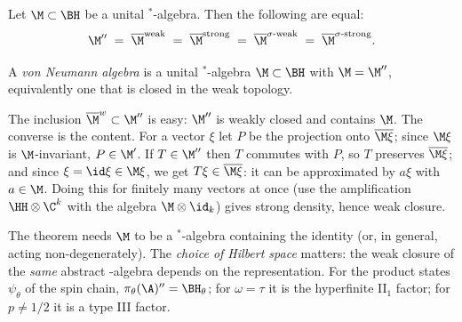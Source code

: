 \begin{theorem}\label{thm:bicomm}
Let $\M\subset\BH$ be a unital $^*$-algebra. Then the following are equal:
\[
\M''\;=\;\overline{\M}^{\rm weak}\;=\;\overline{\M}^{\rm strong}\;=\;\overline{\M}^{\sigma\text{-weak}}\;=\;\overline{\M}^{\sigma\text{-strong}}.
\]
\end{theorem}

\begin{definition}
A \emph{von Neumann algebra} is a unital $^*$-algebra $\M\subset\BH$ with $\M=\M''$, equivalently one that is closed in the weak topology.
\end{definition}

\begin{proofsketch}
The inclusion $\overline\M^{w}\subset\M''$ is easy: $\M''$ is weakly closed and contains $\M$. The converse is the content. For a vector $\xi$ let $P$ be the projection onto $\overline{\M\xi}$; since $\M\xi$ is $\M$-invariant, $P\in\M'$. If $T\in\M''$ then $T$ commutes with $P$, so $T$ preserves $\overline{\M\xi}$; and since $\xi=\id\xi\in\M\xi$, we get $T\xi\in\overline{\M\xi}$: it can be approximated by $a\xi$ with $a\in\M$. Doing this for finitely many vectors at once (use the amplification $\HH\otimes\C^k$ with the algebra $\M\otimes\id_k$) gives strong density, hence weak closure.
\end{proofsketch}

\begin{whatwrong}
The theorem needs $\M$ to be a $^*$-algebra containing the identity (or, in general, acting non-degenerately). The \emph{choice of Hilbert space} matters: the weak closure of the \emph{same} abstract \cstar-algebra depends on the representation. For the product states $\psi_\theta$ of the spin chain, $\pi_\theta(\A)''=\BH_\theta$; for $\omega=\tau$ it is the hyperfinite II$_1$ factor; for $p\ne1/2$ it is a type III factor.
\end{whatwrong}


